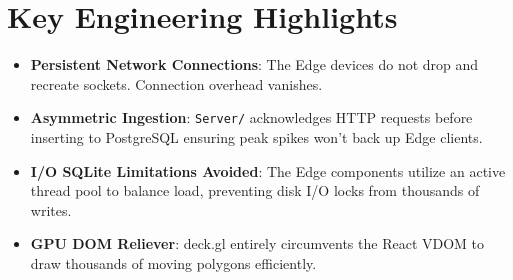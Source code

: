 \documentclass[12pt, a4paper]{article}
\begin{document}
\section{Key Engineering Highlights}
\begin{itemize}
    \item \textbf{Persistent Network Connections}: The Edge devices do not drop and recreate sockets. Connection overhead vanishes. 
    \item \textbf{Asymmetric Ingestion}: \texttt{Server/} acknowledges HTTP requests before inserting to PostgreSQL ensuring peak spikes won't back up Edge clients.
    \item \textbf{I/O SQLite Limitations Avoided}: The Edge components utilize an active thread pool to balance load, preventing disk I/O locks from thousands of writes.
    \item \textbf{GPU DOM Reliever}: deck.gl entirely circumvents the React VDOM to draw thousands of moving polygons efficiently.
\end{itemize}
\end{document}
